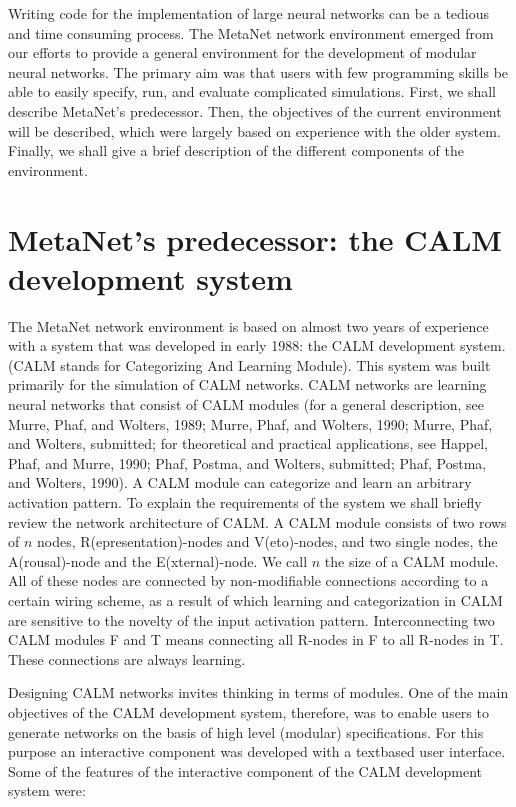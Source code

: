 \documentclass[11pt, a4paper]{article}
\begin{document}
\vspace{6pt}

\noindent Writing code for the implementation of large neural networks can be a tedious and time consuming process. The MetaNet network environment emerged from our efforts to provide a general environment for the development of modular neural networks. The primary aim was that users with few programming skills be able to easily specify, run, and evaluate complicated simulations. First, we shall describe MetaNet's predecessor. Then, the objectives of the current environment will be described, which were largely based on experience with the older system. Finally, we shall give a brief description of the different components of the environment.

\section*{\color{navyaccent} MetaNet's predecessor: the CALM development system}

The MetaNet network environment is based on almost two years of experience with a system that was developed in early 1988: the CALM development system. (CALM stands for Categorizing And Learning Module). This system was built primarily for the simulation of CALM networks. CALM networks are learning neural networks that consist of CALM modules (for a general description, see Murre, Phaf, and Wolters, 1989; Murre, Phaf, and Wolters, 1990; Murre, Phaf, and Wolters, submitted; for theoretical and practical applications, see Happel, Phaf, and Murre, 1990; Phaf, Postma, and Wolters, submitted; Phaf, Postma, and Wolters, 1990). A CALM module can categorize and learn an arbitrary activation pattern. To explain the requirements of the system we shall briefly review the network architecture of CALM. A CALM module consists of two rows of $n$ nodes, R(epresentation)-nodes and V(eto)-nodes, and two single nodes, the A(rousal)-node and the E(xternal)-node. We call $n$ the size of a CALM module. All of these nodes are connected by non-modifiable connections according to a certain wiring scheme, as a result of which learning and categorization in CALM are sensitive to the novelty of the input activation pattern. Interconnecting two CALM modules F and T means connecting all R-nodes in F to all R-nodes in T. These connections are always learning.

Designing CALM networks invites thinking in terms of modules. One of the main objectives of the CALM development system, therefore, was to enable users to generate networks on the basis of high level (modular) specifications. For this purpose an interactive component was developed with a textbased user interface. Some of the features of the interactive component of the CALM development system were:
\end{document}
